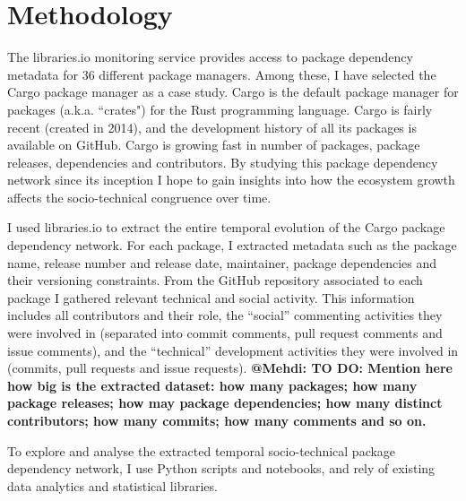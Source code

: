 \section{Methodology}

The \textsf{libraries.io} monitoring service provides access to package dependency metadata for 36 different package managers.
Among these, I have selected the Cargo package manager as a case study. Cargo is the default package manager for packages (a.k.a. ``crates") for the Rust programming language. Cargo is fairly recent (created in 2014), and the development history of all its packages is available on GitHub. 
Cargo is growing fast in number of packages, package releases, dependencies and contributors. 
By studying this package dependency network since its inception I hope to gain insights into how the ecosystem growth affects the socio-technical congruence over time.

I used libraries.io to extract the entire temporal evolution of the Cargo package dependency network. 
For each package, I extracted metadata such as the package name, release number and release date, maintainer, package dependencies and their versioning constraints.
From the GitHub repository associated to each package I gathered relevant technical and social activity. 
This information includes all contributors and their role, the ``social'' commenting activities they were involved in (separated into commit comments, pull request comments and issue comments), and the ``technical'' development activities they were involved in (commits, pull requests and issue requests).
\textbf{\color{red}@Mehdi: TO DO: Mention here how big is the extracted dataset: how many packages; how many package releases; how may package dependencies; how many distinct contributors; how many commits; how many comments and so on.}

To explore and analyse the extracted temporal socio-technical package dependency network, I use Python scripts and notebooks, and rely of existing data analytics and statistical libraries.

